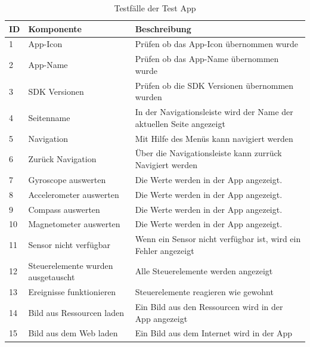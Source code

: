 \begin{table}[!ht]
\begin{tabularx}{\textwidth}{l|l|X}
   \textbf{ID} & \textbf{Komponente} & \textbf{Beschreibung} \\
\hline
1             & App-Icon           	& Prüfen ob das App-Icon übernommen wurde                      			 \\ 
2             & App-Name          	& Prüfen ob das App-Name übernommen wurde                      		 \\ 
3             & SDK Versionen      & Prüfen ob die SDK Versionen übernommen wurden                      \\ 
4             & Seitenname           				& In der Navigationsleiste wird der Name der aktuellen Seite angezeigt                      			 \\ 
5          	  & Navigation         			  	& Mit Hilfe des Menüs kann navigiert werden                      			 \\ 
6             & Zurück Navigation           	& Über die Navigationsleiste kann zurrück Navigiert werden                      			 \\ 
7             & Gyroscope auswerten           	& Die Werte werden in der App angezeigt.                      			 \\ 
8             & Accelerometer auswerten           	& Die Werte werden in der App angezeigt.                   			 \\ 
9             & Compass auswerten           	& Die Werte werden in der App angezeigt.                			 \\ 
10            & Magnetometer auswerten           	& Die Werte werden in der App angezeigt.                			 \\ 
11            & Sensor nicht verfügbar           	& Wenn ein Sensor nicht verfügbar ist, wird ein Fehler angezeigt          			 \\ 
12            & Steuerelemente wurden ausgetauscht           	& Alle Steuerelemente werden angezeigt        			 \\ 
13            & Ereignisse funktionieren           	&  Steuerelemente reagieren wie gewohnt     			 \\ 
14            & Bild aus Ressourcen laden           	& Ein Bild aus den Ressourcen wird in der App angezeigt                      			 \\ 
15             & Bild aus dem Web laden           	& Ein Bild aus dem Internet wird in der App                      			 \\ 
\end{tabularx}
\caption{Testfälle der Test App}
 \label{tab:Testapp}
\end{table}




